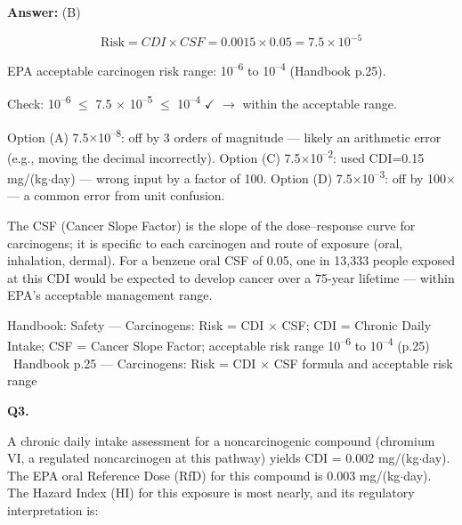 \documentclass[11pt]{article}
\begin{document}
\vspace{2pt}\par\noindent\colorbox{boxbg}{\parbox{\dimexpr\linewidth-2\fboxsep\relax}{%
\vspace{2pt}\textbf{Answer:} (B)\par\vspace{2pt}
{\small \[\text{Risk} = CDI \times CSF = 0.0015 \times 0.05 = 7.5 \times 10^{-5}\]

EPA acceptable carcinogen risk range: 10\textsuperscript{--}\textsuperscript{6} to 10\textsuperscript{--}\textsuperscript{4} (Handbook p.25).

Check: 10\textsuperscript{--}\textsuperscript{6} $\le$ 7.5 $\times$ 10\textsuperscript{--}\textsuperscript{5} $\le$ 10\textsuperscript{--}\textsuperscript{4} $\checkmark$ $\rightarrow$ within the acceptable range.

Option (A) 7.5$\times$10\textsuperscript{--}\textsuperscript{8}: off by 3 orders of magnitude --- likely an arithmetic error (e.g., moving the decimal incorrectly). Option (C) 7.5$\times$10\textsuperscript{--}\textsuperscript{2}: used CDI=0.15 mg/(kg$\cdot$day) --- wrong input by a factor of 100. Option (D) 7.5$\times$10\textsuperscript{--}\textsuperscript{3}: off by 100$\times$ --- a common error from unit confusion.

The CSF (Cancer Slope Factor) is the slope of the dose--response curve for carcinogens; it is specific to each carcinogen and route of exposure (oral, inhalation, dermal). For a benzene oral CSF of 0.05, one in 13,333 people exposed at this CDI would be expected to develop cancer over a 75-year lifetime --- within EPA's acceptable management range.}\par\vspace{2pt}
{\footnotesize\color{soft}Handbook: Safety --- Carcinogens: Risk = CDI $\times$ CSF; CDI = Chronic Daily Intake; CSF = Cancer Slope Factor; acceptable risk range 10\textsuperscript{--}\textsuperscript{6} to 10\textsuperscript{--}\textsuperscript{4} (p.25) \textbullet\ Handbook p.25 --- Carcinogens: Risk = CDI $\times$ CSF formula and acceptable risk range}\vspace{2pt}
}}
\vspace{9pt}
\filbreak
\textbf{\color{accent}Q3.}\quad {\small\color{soft}[D13-Q03 \textbullet\ MCQ \textbullet\ Noncarcinogen --- Hazard Index HI = CDI/RfD (SI)]}\par\vspace{2pt}
A chronic daily intake assessment for a noncarcinogenic compound (chromium VI, a regulated noncarcinogen at this pathway) yields CDI = 0.002 mg/(kg$\cdot$day). The EPA oral Reference Dose (RfD) for this compound is 0.003 mg/(kg$\cdot$day). The Hazard Index (HI) for this exposure is most nearly, and its regulatory interpretation is:\par\vspace{3pt}
\end{document}
